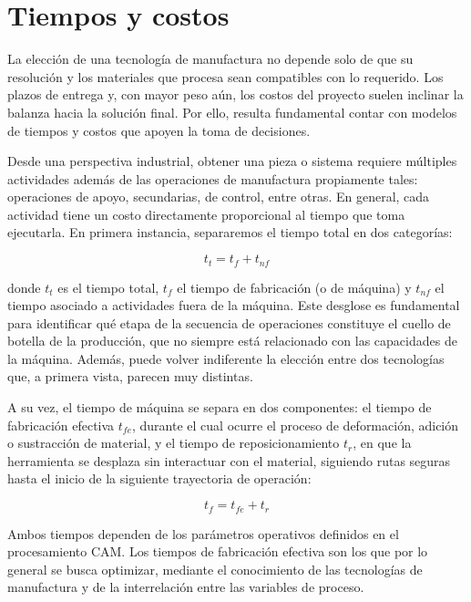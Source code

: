 \section{Tiempos y costos}

La elección de una tecnología de manufactura no depende solo de que su resolución y los materiales que procesa sean compatibles con lo requerido. Los plazos de entrega y, con mayor peso aún, los costos del proyecto suelen inclinar la balanza hacia la solución final. Por ello, resulta fundamental contar con modelos de tiempos y costos que apoyen la toma de decisiones.

Desde una perspectiva industrial, obtener una pieza o sistema requiere múltiples actividades además de las operaciones de manufactura propiamente tales: operaciones de apoyo, secundarias, de control, entre otras. En general, cada actividad tiene un costo directamente proporcional al tiempo que toma ejecutarla. En primera instancia, separaremos el tiempo total en dos categorías:

\begin{equation}
	t_{t}=t_{f}+t_{nf}
	\label{eq:tiempo_total}
\end{equation}

donde $t_{t}$ es el tiempo total, $t_{f}$ el tiempo de fabricación (o de máquina) y $t_{nf}$ el tiempo asociado a actividades fuera de la máquina. Este desglose es fundamental para identificar qué etapa de la secuencia de operaciones constituye el cuello de botella de la producción, que no siempre está relacionado con las capacidades de la máquina. Además, puede volver indiferente la elección entre dos tecnologías que, a primera vista, parecen muy distintas.

A su vez, el tiempo de máquina se separa en dos componentes: el tiempo de fabricación efectiva $t_{fe}$, durante el cual ocurre el proceso de deformación, adición o sustracción de material, y el tiempo de reposicionamiento $t_{r}$, en que la herramienta se desplaza sin interactuar con el material, siguiendo rutas seguras hasta el inicio de la siguiente trayectoria de operación:

\begin{equation}
	t_{f}=t_{fe}+t_{r}
	\label{eq:tiempo_maquina}
\end{equation}

Ambos tiempos dependen de los parámetros operativos definidos en el procesamiento CAM. Los tiempos de fabricación efectiva son los que por lo general se busca optimizar, mediante el conocimiento de las tecnologías de manufactura y de la interrelación entre las variables de proceso.

